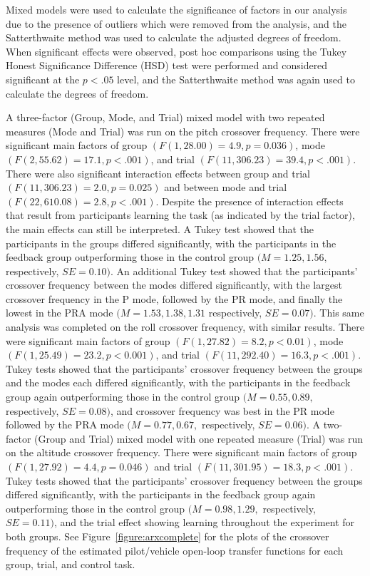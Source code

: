 Mixed models were used to calculate the significance of factors in our analysis due to the presence of outliers which were removed from the analysis, and the Satterthwaite method was used to calculate the adjusted degrees of freedom.
When significant effects were observed, post hoc comparisons using the Tukey Honest Significance Difference (HSD) test were performed and considered significant at the $p < .05$ level, and the Satterthwaite method was again used to calculate the degrees of freedom.

A three-factor (Group, Mode, and Trial) mixed model with two repeated measures (Mode and Trial) was run on the pitch crossover frequency.
There were significant main factors of group $(F(1, 28.00) = 4.9, p = 0.036)$, mode $(F(2, 55.62) = 17.1, p < .001)$, and trial $(F(11, 306.23) = 39.4, p < .001)$.
There were also significant interaction effects between group and trial $(F(11, 306.23) = 2.0, p = 0.025)$ and between mode and trial $(F(22, 610.08) = 2.8, p < .001)$.
Despite the presence of interaction effects that result from participants learning the task (as indicated by the trial factor), the main effects can still be interpreted.
A Tukey test showed that the participants in the groups differed significantly, with the participants in the feedback group outperforming those in the control group $(M = 1.25, 1.56,$ respectively, $SE = 0.10)$.
An additional Tukey test showed that the participants' crossover frequency between the modes differed significantly, with the largest crossover frequency in the P mode, followed by the PR mode, and finally the lowest in the PRA mode $(M = 1.53, 1.38, 1.31$ respectively, $SE = 0.07)$.
This same analysis was completed on the roll crossover frequency, with similar results.
There were significant main factors of group $(F(1, 27.82) = 8.2, p < 0.01)$, mode $(F(1, 25.49) = 23.2, p < 0.001)$, and trial $(F(11, 292.40) = 16.3, p < .001)$.
Tukey tests showed that the participants' crossover frequency between the groups and the modes each differed significantly, with the participants in the feedback group again outperforming those in the control group $(M = 0.55, 0.89,$ respectively, $SE = 0.08)$, and crossover frequency was best in the PR mode followed by the PRA mode $(M = 0.77, 0.67,$ respectively, $SE = 0.06)$.
A two-factor (Group and Trial) mixed model with one repeated measure (Trial) was run on the altitude crossover frequency.
There were significant main factors of group $(F(1, 27.92) = 4.4, p = 0.046)$ and trial $(F(11, 301.95) = 18.3, p < .001)$.
Tukey tests showed that the participants' crossover frequency between the groups differed significantly, with the participants in the feedback group again outperforming those in the control group $(M = 0.98, 1.29,$ respectively, $SE = 0.11)$, and the trial effect showing learning throughout the experiment for both groups.
See Figure~\ref{figure:arxcomplete} for the plots of the crossover frequency of the estimated pilot/vehicle open-loop transfer functions for each group, trial, and control task.

